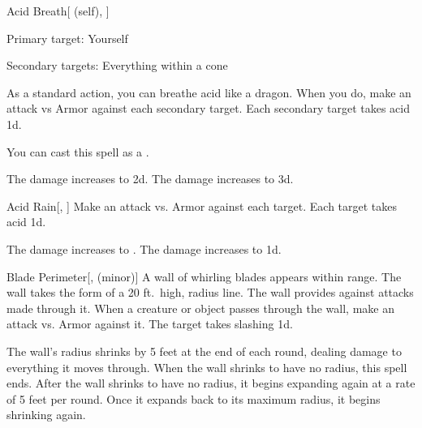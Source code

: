 \lowercase{\hypertarget{spell:Acid Breath}{}}\label{spell:Acid Breath}
\begin{attuneability}[Rank 4]{\hypertarget{spell:Acid Breath}{Acid Breath}}[ (self), ]

Primary target: Yourself
\par\noindent
Secondary targets: Everything within a \arealarge cone

As a standard action, you can breathe acid like a dragon.
When you do, make an attack vs Armor against each secondary target.
\hit Each secondary target takes acid  \plus1d.

You can cast this spell as a .

\rankline
{} The damage increases to  \plus2d.
 The damage increases to  \plus3d.
\end{attuneability}
\vspace{0.25em}



\lowercase{\hypertarget{spell:Acid Rain}{}}\label{spell:Acid Rain}
\begin{freeability}[Rank 4]{\hypertarget{spell:Acid Rain}{Acid Rain}}[, ]
Make an attack vs. Armor against each target.
\hit Each target takes acid  \minus1d.

\rankline
{} The damage increases to .
 The damage increases to  \plus1d.
\end{freeability}
\vspace{0.25em}



\lowercase{\hypertarget{spell:Blade Perimeter}{}}\label{spell:Blade Perimeter}
\begin{freeability}[Rank 4]{\hypertarget{spell:Blade Perimeter}{Blade Perimeter}}[,  (minor)]
A wall of whirling blades appears within \rngmed range.
The wall takes the form of a 20 ft.\ high, \areamed radius line.
The wall provides  against attacks made through it.
When a creature or object passes through the wall, make an attack vs. Armor against it.
\hit The target takes slashing  \minus1d.

\rankline
{} The wall's radius shrinks by 5 feet at the end of each round, dealing damage to everything it moves through.
When the wall shrinks to have no radius, this spell ends.
 After the wall shrinks to have no radius, it begins expanding again at a rate of 5 feet per round.
Once it expands back to its maximum radius, it begins shrinking again.
\end{freeability}
\vspace{0.25em}



